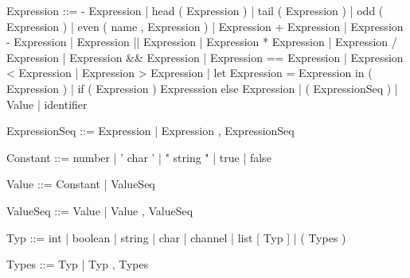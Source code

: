 \documentclass[11pt]{report}
\begin{document}
\begin{verbnobox}[\normalfont]
Expression ::= - Expression
               | head ( Expression )
               | tail ( Expression )
               | odd ( Expression )
               | even ( name , Expression )
               | Expression + Expression
               | Expression - Expression
               | Expression || Expression
               | Expression * Expression
               | Expression / Expression
               | Expression && Expression
               | Expression == Expression
               | Expression < Expression
               | Expression > Expression
               | let Expression = Expression in ( Expression )
               | if ( Expression ) { Expresssion } else { Expression }
               | ( ExpressionSeq )
               | Value
               | identifier
\end{verbnobox}
\vspace*{3pt}

\begin{verbnobox}[\normalfont]
ExpressionSeq ::= Expression | Expression , ExpressionSeq
\end{verbnobox}
\vspace*{3pt}

\begin{verbnobox}[\normalfont]
Constant ::= number
             | ' char '
             | " string "
             | true
             | false
\end{verbnobox}
\vspace*{3pt}

\begin{verbnobox}[\normalfont]
Value ::= Constant | { ValueSeq }
\end{verbnobox}
\vspace*{3pt}

\begin{verbnobox}[\normalfont]
ValueSeq ::= Value | Value , ValueSeq
\end{verbnobox}
\vspace*{3pt}

\begin{verbnobox}[\normalfont]
Typ ::= int
      | boolean
      | string
      | char
      | channel
      | list [ Typ ]
      | ( Types ) 
\end{verbnobox}
\vspace*{3pt}

\begin{verbnobox}[\normalfont]
Types ::= Typ | Typ , Types
\end{verbnobox}
\vspace*{3pt}
\end{document}
